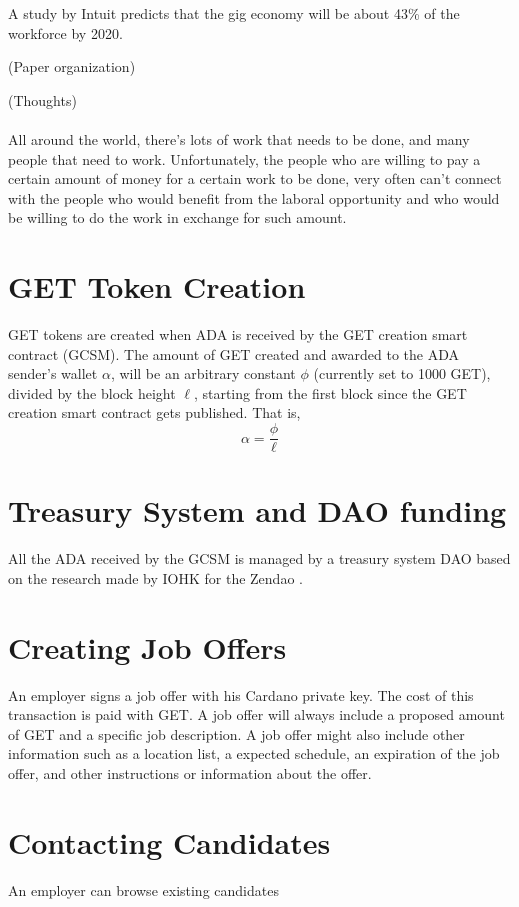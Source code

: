 \documentclass{article}
\begin{document}
A study by Intuit predicts that the gig economy will be about 43\% of the workforce by 2020.

(Paper organization)

(Thoughts)
\paragraph{} All around the world, there's lots of work that needs to be done, and many people that need to work. Unfortunately, the people who are willing to pay a certain amount of money for a certain work to be done, very often can't connect with the people who would benefit from the laboral opportunity and who would be willing to do the work in exchange for such amount.

\section{GET Token Creation}
GET tokens are created when ADA is received by the GET creation smart contract (GCSM).
The amount of GET created and awarded to the ADA sender's wallet $\alpha$, will be an arbitrary constant $\phi$ (currently set to 1000 GET), divided by the block height $\ell$, starting from the first block since the GET creation smart contract gets published. That is,
\[ \alpha
  = \dfrac{\phi}{\ell}
\]

\section{Treasury System and DAO funding}
All the ADA received by the GCSM is managed by a treasury system DAO based on the research made by IOHK for the Zendao \cite{zhangb2}.
 
\section{Creating Job Offers}
An employer signs a job offer with his Cardano private key. The cost of this transaction is paid with GET. A job offer will always include a proposed amount of GET and a specific job description. A job offer might also include other information such as a location list, a expected schedule, an expiration of the job offer, and other instructions or information about the offer.

\section{Contacting Candidates}
An employer can browse existing candidates 
\end{document}
